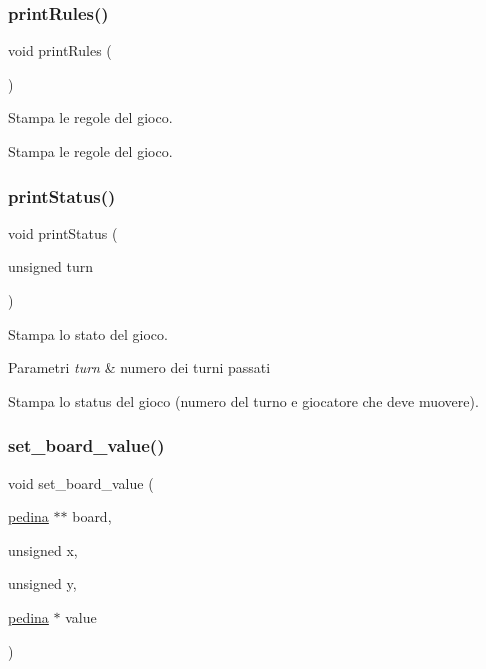 \subsubsection{\texorpdfstring{print\+Rules()}{printRules()}}
{\footnotesize\ttfamily void print\+Rules (\begin{DoxyParamCaption}{ }\end{DoxyParamCaption})}



Stampa le regole del gioco. 

Stampa le regole del gioco. \mbox{\label{group__Funzioni_ga0e671ab1d1412c0843d69c03ab2cfbac}} 
\subsubsection{\texorpdfstring{print\+Status()}{printStatus()}}
{\footnotesize\ttfamily void print\+Status (\begin{DoxyParamCaption}\item[{unsigned}]{turn }\end{DoxyParamCaption})}



Stampa lo stato del gioco. 


\begin{DoxyParams}{Parametri}
{\em turn} & numero dei turni passati\\
\hline
\end{DoxyParams}
Stampa lo status del gioco (numero del turno e giocatore che deve muovere). \mbox{\label{group__Funzioni_gaf41d60dd64b7eb3f58f9d47100461310}} 
\subsubsection{\texorpdfstring{set\+\_\+board\+\_\+value()}{set\_board\_value()}}
{\footnotesize\ttfamily void set\+\_\+board\+\_\+value (\begin{DoxyParamCaption}\item[{\hyperlink{ml__lib_8h_a71fee95122b31f5cb0b07d9c16ffa3a5}{pedina} $\ast$$\ast$}]{board,  }\item[{unsigned}]{x,  }\item[{unsigned}]{y,  }\item[{\hyperlink{ml__lib_8h_a71fee95122b31f5cb0b07d9c16ffa3a5}{pedina} $\ast$}]{value }\end{DoxyParamCaption})}




